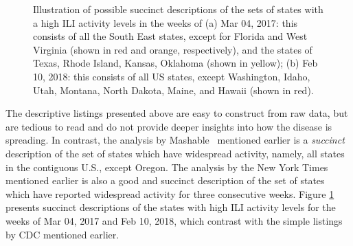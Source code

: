 \begin{figure}[!ht]
\centering
{}
\caption{
Illustration of possible succinct descriptions of the sets of states with
a high ILI activity levels in the weeks of 
(a) Mar 04, 2017: this consists of all the South East states,
except for Florida and West Virginia (shown in red and orange, respectively), 
and the states of Texas, Rhode Island, Kansas, Oklahoma
(shown in yellow);
(b) Feb 10, 2018: this consists of all US states, except 
Washington, Idaho, Utah, Montana, North Dakota, Maine, and Hawaii
(shown in red).
}
\label{fig:summaries}
\end{figure}

The descriptive listings presented above are easy to construct from raw data,
but are tedious to read and do not provide deeper insights into how the
disease is spreading.
In contrast, the analysis by Mashable~\cite{mashable} mentioned
earlier is a \emph{succinct} description
of the set of states which have widespread activity,
namely, all states in the contiguous U.S., except Oregon.
The analysis by the New York Times~\cite{nytimes} mentioned earlier
is also a good and succinct description
of the set of states which have reported widespread activity for three consecutive weeks. 
Figure \ref{fig:summaries} presents succinct descriptions 
of the states with high ILI activity levels for the weeks of 
Mar 04, 2017 and Feb 10, 2018, which contrast with the simple listings by CDC
mentioned earlier.

